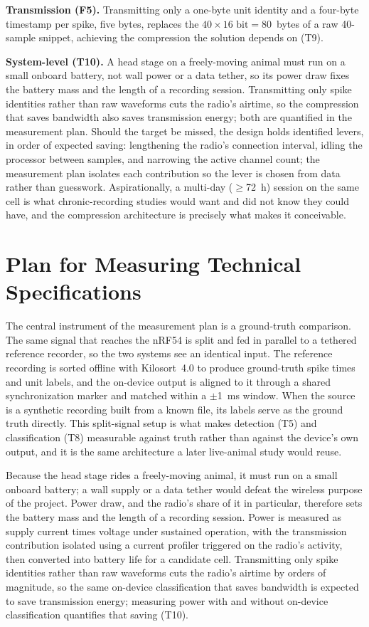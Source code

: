 \documentclass[11pt]{article}
\begin{document}
\textbf{Transmission (F5).} Transmitting only a one-byte unit identity and a four-byte
timestamp per spike, five bytes, replaces the $40 \times 16\text{~bit} = 80$~bytes of a
raw 40-sample snippet, achieving the
compression the solution depends on (T9).

\textbf{System-level (T10).} A head stage on a freely-moving animal must run on a small
onboard battery, not wall power or a data tether, so its power draw fixes the battery mass
and the length of a recording session. Transmitting only spike identities rather than raw
waveforms cuts the radio's airtime, so the compression that saves bandwidth also saves
transmission energy; both are quantified in the measurement plan. Should the target be
missed, the design holds identified levers, in order of expected saving: lengthening the
radio's connection interval, idling the processor between samples, and narrowing the
active channel count; the measurement plan isolates each contribution so the lever is
chosen from data rather than guesswork. Aspirationally, a multi-day ($\geq$72~h)
session on the same cell is what chronic-recording studies would want and did not know
they could have, and the compression architecture is precisely what makes it
conceivable.

\section{Plan for Measuring Technical Specifications}

The central instrument of the measurement plan is a ground-truth comparison. The same
signal that reaches the nRF54 is split and fed in parallel to a tethered
reference recorder, so the two systems see an identical input. The reference recording is
sorted offline with Kilosort~4.0 to produce ground-truth spike times and unit labels, and the
on-device output is aligned to it through a shared synchronization marker and matched within a
$\pm$1~ms window. When the source is a synthetic recording built from a known file, its labels
serve as the ground truth directly. This split-signal setup is what makes detection (T5) and
classification (T8) measurable against truth rather than against the device's own output, and
it is the same architecture a later live-animal study would reuse.

Because the head stage rides a freely-moving animal, it must run on a small onboard battery; a
wall supply or a data tether would defeat the wireless purpose of the project. Power draw, and
the radio's share of it in particular, therefore sets the battery mass and the length of a
recording session. Power is measured as supply current times voltage under sustained
operation, with the transmission contribution isolated using a current profiler triggered on
the radio's activity, then converted into battery life for a candidate cell. Transmitting only
spike identities rather than raw waveforms cuts the radio's airtime by orders of magnitude, so
the same on-device classification that saves bandwidth is expected to save transmission energy;
measuring power with and without on-device classification quantifies that saving (T10).
\end{document}
